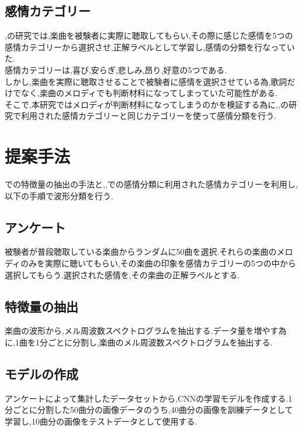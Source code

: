 \documentclass[twocolumn,twoside,9.5pt]{jarticle}
\begin{document}
\subsection{感情カテゴリー}
\cite{gushiken1},\cite{gushiken2}の研究では,楽曲を被験者に実際に聴取してもらい,その際に感じた感情を5つの感情カテゴリーから選択させ,正解ラベルとして学習し,感情の分類を行なっていた.\\
感情カテゴリーは,喜び,安らぎ,悲しみ,昂り,好意の5つである.\\
しかし,楽曲を実際に聴取させることで被験者に感情を選択させている為,歌詞だけでなく,楽曲のメロディでも判断材料になってしまっていた可能性がある.\\
そこで,本研究ではメロディが判断材料になってしまうのかを検証する為に,\cite{gushiken1},\cite{gushiken2}の研究で利用された感情カテゴリーと同じカテゴリーを使って感情分類を行う.

\section{提案手法}
\cite{deep}での特徴量の抽出の手法と,\cite{gushiken1},\cite{gushiken2}での感情分類に利用された感情カテゴリーを利用し,以下の手順で波形分類を行う.

\subsection{アンケート}
被験者が普段聴取している楽曲からランダムに50曲を選択.それらの楽曲のメロディのみを実際に聴いてもらい,その楽曲の印象を感情カテゴリーの5つの中から選択してもらう.選択された感情を,その楽曲の正解ラベルとする.\\

\subsection{特徴量の抽出}
楽曲の波形から,メル周波数スペクトログラムを抽出する.データ量を増やす為に,1曲を1分ごとに分割し,楽曲のメル周波数スペクトログラムを抽出する.\\

\subsection{モデルの作成}
アンケートによって集計したデータセットから,CNNの学習モデルを作成する.1分ごとに分割した50曲分の画像データのうち,40曲分の画像を訓練データとして学習し,10曲分の画像をテストデータとして使用する.\\
\end{document}
